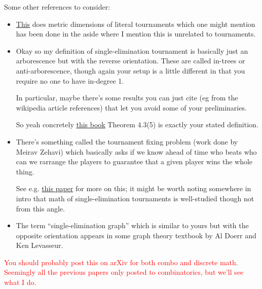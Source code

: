 \documentclass[12pt,letterpaper]{article}
\theoremstyle{definition}
\renewcommand{\1}{\mathbbm{1}}
\renewcommand{\SS}[1]{\textcolor{red}{#1}}
\begin{document}
Some other references to consider:
\begin{itemize}
	\item \href{https://www.combinatorics.org/ojs/index.php/eljc/article/view/v20i1p69/pdf}{This} does metric dimensions of literal tournaments which one might mention has been done in the aside where I mention this is unrelated to tournaments.
	\item Okay so my definition of single-elimination tournament is basically just an arborescence but with the reverse orientation.  These are called in-trees or anti-arborescence, though again your setup is a little different in that you require no one to have in-degree 1.
	
	In particular, maybe there's some results you can just cite (eg from the wikipedia article references) that let you avoid some of your preliminaries.
	
	So yeah concretely \href{https://web.cecs.pdx.edu/~antoy/Courses/CS250/open_books/discmath-root-b.pdf}{this book} Theorem 4.3(5) is exactly your stated definition.
	
	\item There's something called the tournament fixing problem (work done by Meirav Zehavi) which basically asks if we know ahead of time who beats who can we rarrange the players to guarantee that a given player wins the whole thing.
	
	See e.g. \href{https://drops.dagstuhl.de/storage/00lipics/lipics-vol321-ipec2024/LIPIcs.IPEC.2024.7/LIPIcs.IPEC.2024.7.pdf}{this paper} for more on this; it might be worth noting somewhere in intro that math of single-elimination tournaments is well-studied though not from this angle.
	\item The term ``single-elimination graph'' which is similar to yours but with the opposite orientation appears in some graph theory textbook by Al Doerr and Ken Levasseur.
\end{itemize}

\SS{You should probably post this on arXiv for both combo and discrete math.  Seemingly all the previous papers only posted to combinatorics, but we'll see what I do.}
\fi 
\end{document}
